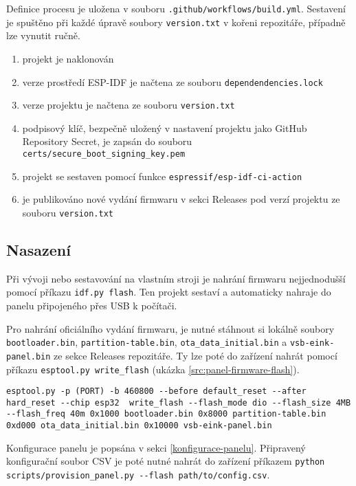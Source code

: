 Definice procesu je uložena v souboru \lstinline|.github/workflows/build.yml|. Sestavení je spuštěno při každé úpravě soubory \lstinline|version.txt| v kořeni repozitáře, případně lze vynutit ručně.

\begin{enumerate}
    \item projekt je naklonován
    \item verze prostředí ESP-IDF je načtena ze souboru \lstinline|dependendencies.lock|
    \item verze projektu je načtena ze souboru \lstinline|version.txt|
    \item podpisový klíč, bezpečně uložený v nastavení projektu jako GitHub Repository Secret\cite{UsingSecretsGitHub}, je zapsán do souboru \lstinline|certs/secure_boot_signing_key.pem|
    \item projekt se sestaven pomocí funkce \lstinline|espressif/esp-idf-ci-action|
    \item je publikováno nové vydání firmwaru v sekci Releases pod verzí projektu ze souboru \lstinline|version.txt|
\end{enumerate}

\subsection{Nasazení}
Při vývoji nebo sestavování na vlastním stroji je nahrání firmwaru nejjednodušší pomocí příkazu \lstinline|idf.py flash|. Ten projekt sestaví a automaticky nahraje do panelu připojeného přes USB k počítači.

Pro nahrání oficiálního vydání firmwaru, je nutné stáhnout si lokálně soubory \lstinline|bootloader.bin|, \lstinline|partition-table.bin|, \lstinline|ota_data_initial.bin| a \lstinline|vsb-eink-panel.bin| ze sekce Releases repozitáře. Ty lze poté do zařízení nahrát pomocí příkazu \lstinline|esptool.py write_flash| (ukázka \ref{src:panel-firmware-flash}).

\begin{lstlisting}[label=src:panel-firmware-flash, caption={Nahrání oficiálního firmwaru do panelu}]
esptool.py -p (PORT) -b 460800 --before default_reset --after hard_reset --chip esp32  write_flash --flash_mode dio --flash_size 4MB --flash_freq 40m 0x1000 bootloader.bin 0x8000 partition-table.bin 0xd000 ota_data_initial.bin 0x10000 vsb-eink-panel.bin
\end{lstlisting}

Konfigurace panelu je popsána v sekci \ref{konfigurace-panelu}. Připravený konfigurační soubor CSV je poté nutné nahrát do zařízení příkazem \lstinline|python scripts/provision_panel.py --flash path/to/config.csv|.

